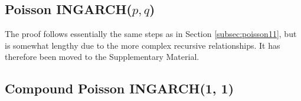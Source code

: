 \documentclass[review]{elsarticle}
\begin{document}
%
%
%
%
%
%  


\subsection{Poisson INGARCH($p, q$)}
\label{subsec:derivation_poissonpq}

The proof follows essentially the same steps as in Section \ref{subsec:poisson11}, but is somewhat lengthy due to the more complex recursive relationships. It has therefore been moved to the Supplementary Material.


\subsection{Compound Poisson INGARCH(1, 1)}
\end{document}
